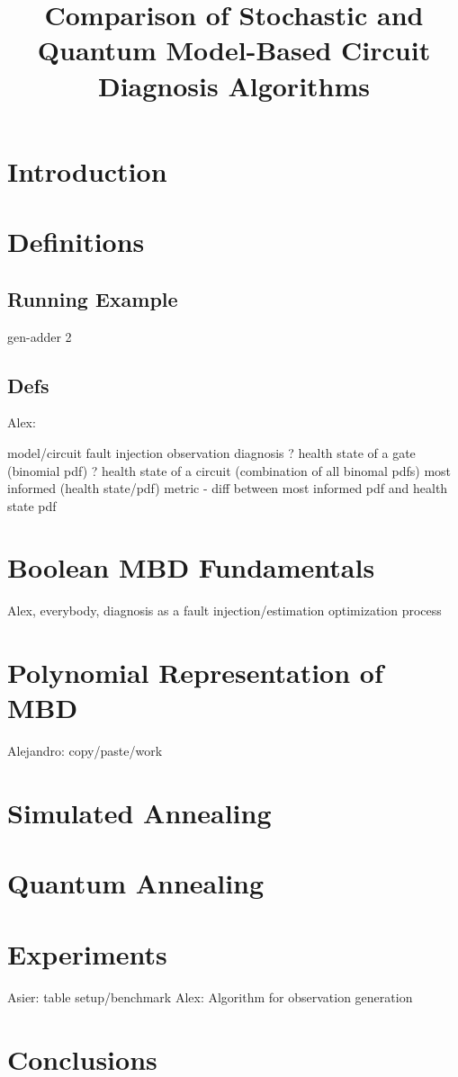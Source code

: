 \title{Comparison of Stochastic and Quantum Model-Based Circuit Diagnosis Algorithms}

\section{Introduction}
\section{Definitions}

\subsection{Running Example}

gen-adder 2

\subsection{Defs}
Alex: 

model/circuit
fault injection
observation
diagnosis
? health state of a gate (binomial pdf)
? health state of a circuit (combination of all binomal pdfs)
most informed (health state/pdf)
metric - diff between most informed pdf and health state pdf

\section{Boolean MBD Fundamentals}

Alex, everybody, diagnosis as a fault injection/estimation optimization process

\section{Polynomial Representation of MBD}

Alejandro: copy/paste/work

\section{Simulated Annealing}
\section{Quantum Annealing}

\section{Experiments}
Asier: table setup/benchmark
Alex: Algorithm for observation generation

\section{Conclusions}


